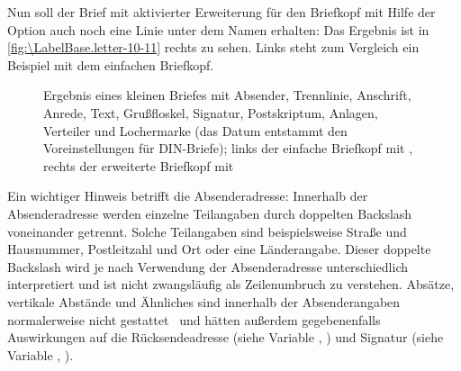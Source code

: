 \begin{Example}
  Nun soll der Brief mit aktivierter Erweiterung für den Briefkopf mit Hilfe
  der Option  auch noch eine Linie unter dem Namen erhalten:%
  Das Ergebnis ist in \autoref{fig:\LabelBase.letter-10-11} rechts zu sehen. %
  \iffalse %
  Im Vergleich dazu ist links daneben das gleiche Beispiel noch einmal mit dem
  einfachen Briefkopf und ohne Reaktion auf die zusätzliche Option.
  \else %
  Links steht zum Vergleich ein Beispiel mit dem einfachen Briefkopf.
  \fi 
  \begin{figure}
    \centering
    \quad
    \caption[{Beispiel: Brief mit Absender, Trennlinie, Anschrift, Anrede, Text,
      Grußfloskel, Signatur, Postskriptum, Anlagen, Verteiler und
      Lochermarke}]{Ergebnis eines kleinen Briefes mit Absender, Trennlinie,
      Anschrift, Anrede, Text, Grußfloskel, Signatur, Postskriptum, Anlagen,
      Verteiler und Lochermarke (das Datum entstammt den Voreinstellungen für
      DIN-Briefe); links der einfache Briefkopf mit
      , rechts der erweiterte
      Briefkopf mit }
    \label{fig:\LabelBase.letter-10-11}
  \end{figure}
\end{Example}

Ein wichtiger Hinweis betrifft  die
Absenderadresse: Innerhalb der Absenderadresse werden einzelne Teilangaben
durch doppelten Backslash voneinander getrennt. Solche Teilangaben sind
beispielsweise Straße und Hausnummer, Postleitzahl und Ort oder eine
Länderangabe. Dieser doppelte Backslash wird je nach Verwendung der
Absenderadresse unterschiedlich interpretiert und ist nicht zwangsläufig als
Zeilenumbruch zu verstehen.  Absätze, vertikale Abstände und Ähnliches sind
innerhalb der Absenderangaben normalerweise nicht gestattet%
\iffalse %
. Man muss \KOMAScript{} schon sehr genau kennen, um solche Mittel
gegebenenfalls sinnvoll im Absender einsetzen zu können.  Außerdem sollte man
in dem Fall unbedingt die Variablen für Rücksendeadresse (siehe Variable
\DescRef{\LabelBase.variable.backaddress},
\DescPageRef{\LabelBase.variable.backaddress}) und Signatur (siehe Variable
\DescRef{\LabelBase.variable.signature},
\DescPageRef{\LabelBase.variable.signature}) selbst setzen.%
\else %
\ und hätten außerdem gegebenenfalls Auswirkungen auf die Rücksendeadresse
(siehe Variable ,
) und Signatur (siehe Variable
,
).%
\fi %
%
\EndIndexGroup


